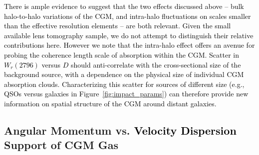 \documentclass[twocolumn]{aastex62}
\begin{document}
\textcolor{black}{There is ample evidence to suggest that the two effects discussed above -- bulk halo-to-halo variations of the CGM, and intra-halo fluctuations on scales smaller than the effective resolution elements -- are both relevant. Given the small available lens tomography sample, we do not attempt to distinguish their relative contributions here. However we note that the intra-halo effect offers an avenue for probing the coherence length scale of absorption within the CGM. Scatter in $W_{r}(2796)$ versus $D$ should anti-correlate with the cross-sectional size of the background source, with a dependence on the physical size of individual CGM absorption clouds. 
Characterizing this scatter for sources of different size (e.g., QSOs versus galaxies in Figure~\ref{fig:impact_params}) can therefore provide new information on spatial structure of the CGM around distant galaxies. 
}



\subsection{Angular Momentum vs. \textcolor{black}{Velocity Dispersion} Support of CGM Gas}\label{sec:kinematics}

\end{document}
